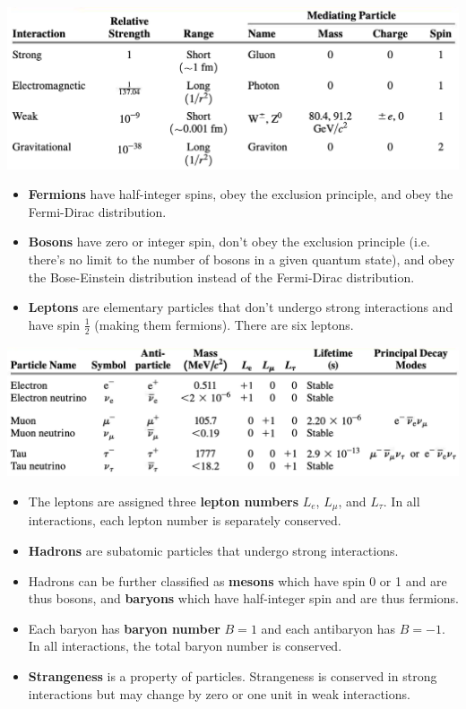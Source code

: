 \documentclass{article}
\begin{document}
\includegraphics[scale=0.5]{interactions}

\begin{itemize}
  \item \textbf{Fermions} have half-integer spins, obey the exclusion principle, and obey the Fermi-Dirac distribution.

  \item \textbf{Bosons} have zero or integer spin, don't obey the exclusion principle (i.e. there's no limit to the number of bosons in a given quantum state), and obey the Bose-Einstein distribution instead of the Fermi-Dirac distribution.

  \item \textbf{Leptons} are elementary particles that don't undergo strong interactions and have spin $\frac{1}{2}$ (making them fermions). There are six leptons.
\end{itemize}

\includegraphics[scale=0.48]{leptons}

\begin{itemize}
  \item The leptons are assigned three \textbf{lepton numbers} $L_e$, $L_\mu$, and $L_\tau$. In all interactions, each lepton number is separately conserved.

  \item \textbf{Hadrons} are subatomic particles that undergo strong interactions.

  \item Hadrons can be further classified as \textbf{mesons} which have spin 0 or 1 and are thus bosons, and \textbf{baryons} which have half-integer spin and are thus fermions.

  \item Each baryon has \textbf{baryon number} $B = 1$ and each antibaryon has $B = -1$. In all interactions, the total baryon number is conserved.

  \item \textbf{Strangeness} is a property of particles. Strangeness is conserved in strong interactions but may change by zero or one unit in weak interactions.
\end{itemize}
\end{document}
